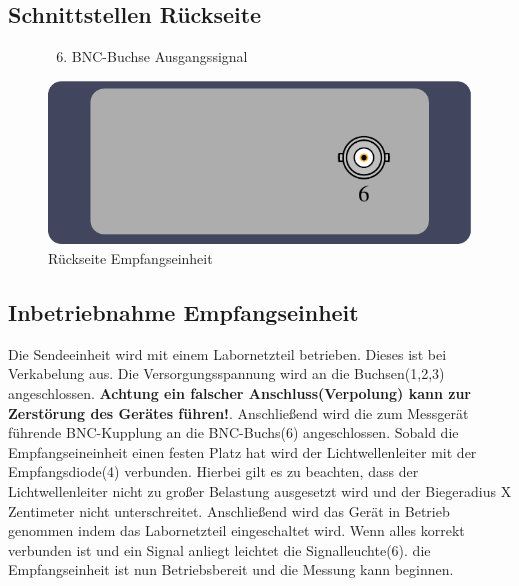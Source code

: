 \documentclass[10pt,a4paper]{scrartcl}
\begin{document}
\subsection{Schnittstellen Rückseite}
\begin{figure}[H]
\begin{minipage}[t]{6cm}
\vspace{0pt}
\begin{enumerate}
\setcounter{enumi}{5}
\item BNC-Buchse Ausgangssignal
\end{enumerate}
\end{minipage}
\hfill
\begin{minipage}[t]{6.5cm}
\vspace{0pt}
\includegraphics[scale=0.7]{gfx/rx-back.pdf}
\caption{Rückseite Empfangseinheit}
\label{fig:Bild4}
\end{minipage}
\end{figure}

\subsection{Inbetriebnahme Empfangseinheit}
Die Sendeeinheit wird mit einem Labornetzteil betrieben. Dieses ist bei Verkabelung aus.
Die Versorgungsspannung wird an die Buchsen(1,2,3) angeschlossen. \textbf{Achtung ein falscher Anschluss(Verpolung) kann zur Zerstörung des Gerätes führen!}. Anschließend wird die zum Messgerät führende BNC-Kupplung an die BNC-Buchs(6) angeschlossen. Sobald die Empfangseineinheit einen festen Platz hat wird der Lichtwellenleiter mit der Empfangsdiode(4) verbunden. Hierbei gilt es zu beachten, dass der Lichtwellenleiter nicht zu großer Belastung ausgesetzt wird und der Biegeradius X Zentimeter nicht unterschreitet. Anschließend wird das Gerät in Betrieb genommen indem das Labornetzteil eingeschaltet wird. Wenn alles korrekt verbunden ist und ein Signal anliegt leichtet die Signalleuchte(6).
die Empfangseinheit ist nun Betriebsbereit und die Messung kann beginnen.
\end{document}
